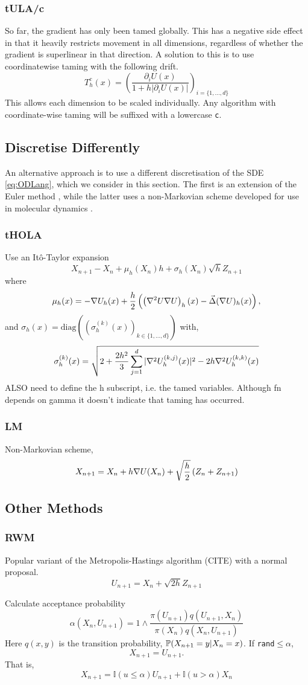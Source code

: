 \subsubsection{tULA/c}
So far, the gradient has only been tamed globally. This has a negative side effect in that it heavily restricts movement in all dimensions, regardless of whether the gradient is superlinear in that direction. A solution to this is to use coordinatewise taming with the following drift.
  \[T^c_{h}(x) =\left(\frac{\partial_i U(x)}{1+h|\partial_i U(x)|}\right)_{i=\lbrace 1, \dots, d\rbrace} \]
This allows each dimension to be scaled individually. Any algorithm with coordinate-wise taming will be suffixed with a lowercase \texttt{c}.

\subsection{Discretise Differently}
An alternative approach is to use a different discretisation of the SDE \eqref{eq:ODLang}, which we consider in this section. The first is an extension of the Euler method \cite{Sabanis18tHOLA}, while the latter uses a non-Markovian scheme developed for use in molecular dynamics \cite{LM12}.
\subsubsection{tHOLA}

Use an It\^o-Taylor expansion
\[X_{n+1} - X_n + \mu_{h}(X_n)h +\sigma_{h}(X_n)\sqrt{h}Z_{n+1}\]
where
\[\mu_{h}(x) = -\grad U_{h}(x) +\frac{h}{2}\left( \left( \grad^2U\grad U\right)_{h}(x) - \vec{\Delta}(\grad U)_{h}(x)\right) ,\]
and \(\sigma_{h}(x) = \text{diag}\left(\left( \sigma_{h}^{(k)}(x)\right)_{k\in \lbrace 1,\dots,d\rbrace}\right)\) with,
\[\sigma_{h}^{(k)}(x) = \sqrt{2+\frac{2h^2}{3}\sum_{j=1}^d |\grad^2 U_{h}^{(k,j)}(x)|^2 - 2h \grad^2 U_{h}^{(k,k)}(x)}\]
ALSO need to define the h subscript, i.e. the tamed variables.  Although fn depends on gamma it doesn't indicate that taming has occurred.
\subsubsection{LM}
\cite{LM12}
Non-Markovian scheme,
\[X_{n+1} = X_n +h \grad U(X_n) + \sqrt{\frac{h}{2}} \left(Z_n + Z_{n+1}\right) \]


\subsection{Other Methods}
\subsubsection{RWM}
Popular variant of the Metropolis-Hastings algorithm (CITE) with a normal proposal.
\[U_{n+1} = X_n + \sqrt{2h} Z_{n+1}\]

Calculate acceptance probability
\[\alpha(X_n,U_{n+1}) = 1\wedge \frac{\pi(U_{n+1})q(U_{n+1},X_n)}{\pi(X_n)q(X_n,U_{n+1})}\]
Here \(q(x,y)\) is the transition probability, \(\P(X_{n+1}=y | X_{n}=x)\). If \texttt{rand}\(\leq\alpha\),
\[X_{n+1} = U_{n+1}.\]
That is,
\[X_{n+1} = \mathbb{I}(u\leq \alpha)U_{n+1} +\mathbb{I}(u > \alpha)X_n \]
